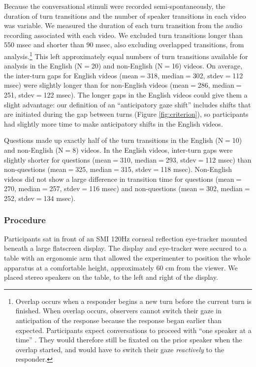 \documentclass[authoryear, 12pt]{elsarticle}
\begin{document}
Because the conversational stimuli were recorded semi-spontaneously, the duration of turn transitions and the number of speaker transitions in each video was variable. We measured the duration of each turn transition from the audio recording associated with each video. We excluded turn transitions longer than 550 msec and shorter than 90 msec, also excluding overlapped transitions, from analysis.\footnote{Overlap occurs when a responder begins a new turn before the current turn is finished. When overlap occurs, observers cannot switch their gaze in anticipation of the response because the response began earlier than expected. Participants expect conversations to proceed with ``one speaker at a time'' \citep{sacks1974}. They would therefore still be fixated on the prior speaker when the overlap started, and would have to switch their gaze \textit{reactively} to the responder.} This left approximately equal numbers of turn transitions available for analysis in the English (N$=$20) and non-English (N$=$16) videos. On average, the inter-turn gaps for English videos (mean$=$318, median$=$302, stdev$=$112 msec) were slightly longer than for non-English videos (mean$=$286, median$=$251, stdev$=$122 msec). The longer gaps in the English videos could give them a slight advantage: our definition of an ``anticipatory gaze shift'' includes shifts that are initiated during the gap between turns (Figure \ref{fig:criterion}), so participants had slightly more time to make anticipatory shifts in the English videos.

Questions made up exactly half of the turn transitions in the English (N$=$10) and non-English (N$=$8) videos. In the English videos, inter-turn gaps were slightly shorter for questions (mean$=$310, median$=$293, stdev$=$112 msec) than non-questions (mean$=$325, median$=$315, stdev$=$118 msec). Non-English videos did not show a large difference in transition time for questions (mean$=$270, median$=$257, stdev$=$116 msec) and non-questions (mean$=$302, median$=$252, stdev$=$134 msec).

\subsubsection{Procedure} 
Participants sat in front of an SMI 120Hz corneal reflection eye-tracker mounted beneath a large flatscreen display. The display and eye-tracker were secured to a table with an ergonomic arm that allowed the experimenter to position the whole apparatus at a comfortable height, approximately 60 cm from the viewer. We placed stereo speakers on the table, to the left and right of the display. 
\end{document}
